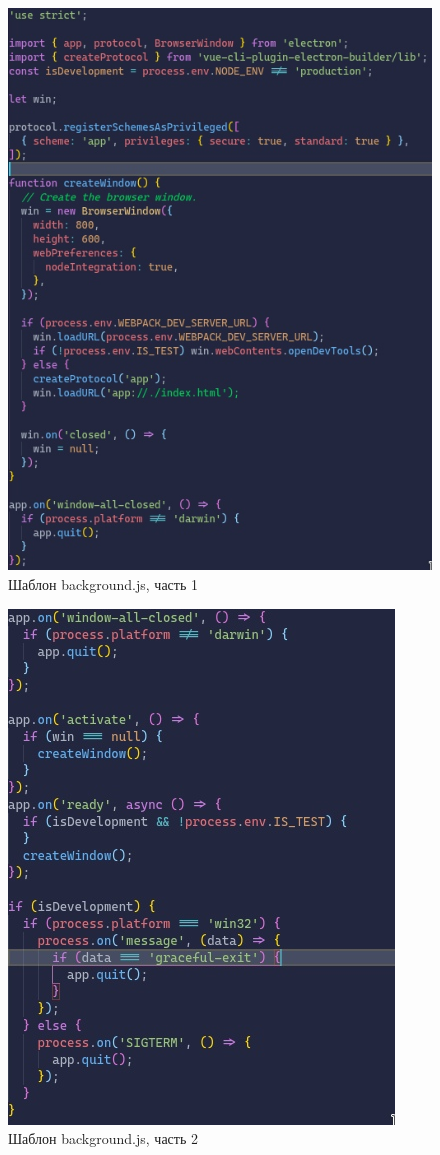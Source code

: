 \begin{figure}[H]
  \centering
  \includegraphics[height=0.4\textheight]{TexModules/pics/backPT1.jpg}
  \caption{Шаблон background.js, часть 1}
  \label{img:backPT1}
\end{figure}

\begin{figure}[H]
  \centering
  \includegraphics[height=0.4\textheight]{TexModules/pics/backPT2.jpg}
  \caption{Шаблон background.js, часть 2}
  \label{img:backPT2}
\end{figure}